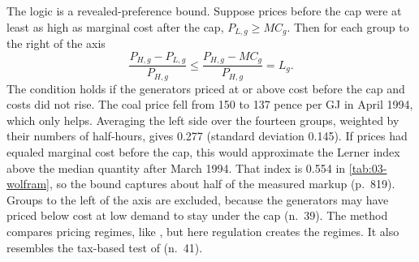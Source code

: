 The logic is a revealed-preference bound. Suppose prices before the cap were at least as high as marginal cost after
the cap, $P_{L,g} \ge MC_g$. Then for each group to the right of the axis
\begin{equation}\label{eq:03-rotation-bound}
\frac{P_{H,g} - P_{L,g}}{P_{H,g}} \le \frac{P_{H,g} - MC_g}{P_{H,g}} = L_g.
\end{equation}
The condition holds if the generators priced at or above cost before the cap and costs did not rise. The coal price
fell from 150 to 137 pence per GJ in April 1994, which only helps. Averaging the left side over the fourteen groups,
weighted by their numbers of half-hours, gives 0.277 (standard deviation 0.145). If prices had equaled marginal cost
before the cap, this would approximate the Lerner index above the median quantity after March 1994. That index is 0.554
in \cref{tab:03-wolfram}, so the bound captures about half of the measured markup (p.~819). Groups to the left of the
axis are excluded, because the generators may have priced below cost at low demand to stay under the cap (n.~39). The
method compares pricing regimes, like \citet{Porter1983}, but here regulation creates the regimes. It also resembles
the tax-based test of \citet{AshenfelterSullivan1987} (n.~41).

